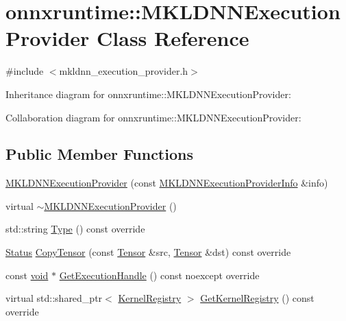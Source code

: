 \hypertarget{classonnxruntime_1_1MKLDNNExecutionProvider}{}\section{onnxruntime\+:\+:M\+K\+L\+D\+N\+N\+Execution\+Provider Class Reference}
\label{classonnxruntime_1_1MKLDNNExecutionProvider}


{\ttfamily \#include $<$mkldnn\+\_\+execution\+\_\+provider.\+h$>$}



Inheritance diagram for onnxruntime\+:\+:M\+K\+L\+D\+N\+N\+Execution\+Provider\+:


Collaboration diagram for onnxruntime\+:\+:M\+K\+L\+D\+N\+N\+Execution\+Provider\+:
\subsection*{Public Member Functions}
\begin{DoxyCompactItemize}
\item 
\mbox{\hyperlink{classonnxruntime_1_1MKLDNNExecutionProvider_a7c3d7298c44f70b17d3ded733ad85f4e}{M\+K\+L\+D\+N\+N\+Execution\+Provider}} (const \mbox{\hyperlink{structonnxruntime_1_1MKLDNNExecutionProviderInfo}{M\+K\+L\+D\+N\+N\+Execution\+Provider\+Info}} \&info)
\item 
virtual \mbox{\hyperlink{classonnxruntime_1_1MKLDNNExecutionProvider_aefa7535d02badeb51b9a3d1e20bf6f32}{$\sim$\+M\+K\+L\+D\+N\+N\+Execution\+Provider}} ()
\item 
std\+::string \mbox{\hyperlink{classonnxruntime_1_1MKLDNNExecutionProvider_a9d13e248253f882664260bb3e7d093b9}{Type}} () const override
\item 
\mbox{\hyperlink{classonnxruntime_1_1common_1_1Status}{Status}} \mbox{\hyperlink{classonnxruntime_1_1MKLDNNExecutionProvider_a84adc2668cac60f53d2566e03b2080b0}{Copy\+Tensor}} (const \mbox{\hyperlink{classonnxruntime_1_1Tensor}{Tensor}} \&src, \mbox{\hyperlink{classonnxruntime_1_1Tensor}{Tensor}} \&dst) const override
\item 
const \mbox{\hyperlink{mlasi_8h_a88f941d423cb2a819b70a1358982b1a6}{void}} $\ast$ \mbox{\hyperlink{classonnxruntime_1_1MKLDNNExecutionProvider_a8e47e298e1b0d6bd0b8bde10d6e1d7e4}{Get\+Execution\+Handle}} () const noexcept override
\item 
virtual std\+::shared\+\_\+ptr$<$ \mbox{\hyperlink{classonnxruntime_1_1KernelRegistry}{Kernel\+Registry}} $>$ \mbox{\hyperlink{classonnxruntime_1_1MKLDNNExecutionProvider_ad6f1e4b2ef0355a8f6b9c8fd866257ef}{Get\+Kernel\+Registry}} () const override
\end{DoxyCompactItemize}


